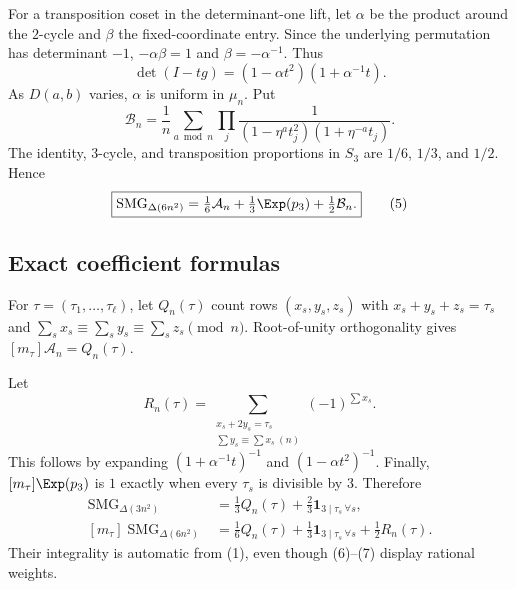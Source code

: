 \documentclass[10pt]{article}
\newcommand{\SMG}{\operatorname{SMG}}
\newcommand{\MGF}{\SMG}
\begin{document}
For a transposition coset in the determinant-one lift, let $\alpha$ be the product around the $2$-cycle and $\beta$ the fixed-coordinate entry.  Since the underlying permutation has determinant $-1$, $-\alpha\beta=1$ and $\beta=-\alpha^{-1}$.  Thus
\[
 \det(I-tg)=(1-\alpha t^2)(1+\alpha^{-1}t).
\]
As $D(a,b)$ varies, $\alpha$ is uniform in $\mu_n$.  Put
\[
 \mathcal B_n=\frac1n\sum_{a\bmod n}\prod_j
 \frac1{(1-\eta^at_j^2)(1+\eta^{-a}t_j)}. \tag{4}
\]
The identity, $3$-cycle, and transposition proportions in $S_3$ are $1/6$, $1/3$, and $1/2$.  Hence
\begin{equation}
 \boxed{\MGF_{\Delta(6n^2)}=\tfrac16\mathcal A_n+\tfrac13\Exp(p_3)+\tfrac12\mathcal B_n.} \tag{5}
\end{equation}

\subsection{Exact coefficient formulas}
For $\tau=(\tau_1,\ldots,\tau_\ell)$, let $Q_n(\tau)$ count rows
$(x_s,y_s,z_s)$ with $x_s+y_s+z_s=\tau_s$ and
$\sum_sx_s\equiv\sum_sy_s\equiv\sum_sz_s\pmod n$.  Root-of-unity orthogonality gives $[m_\tau]\mathcal A_n=Q_n(\tau)$.

Let
\[
 R_n(\tau)=\sum_{\substack{x_s+2y_s=\tau_s\\ \sum y_s\equiv\sum x_s\ (n)}}(-1)^{\sum x_s}.
\]
This follows by expanding $(1+\alpha^{-1}t)^{-1}$ and $(1-\alpha t^2)^{-1}$.  Finally, $[m_\tau]\Exp(p_3)$ is $1$ exactly when every $\tau_s$ is divisible by $3$.  Therefore
\begin{align}
 [m_\tau]\MGF_{\Delta(3n^2)}&=\tfrac13Q_n(\tau)+\tfrac23\mathbf1_{3\mid\tau_s\ \forall s}, \tag{6}\\
 [m_\tau]\MGF_{\Delta(6n^2)}&=\tfrac16Q_n(\tau)+\tfrac13\mathbf1_{3\mid\tau_s\ \forall s}+\tfrac12R_n(\tau). \tag{7}
\end{align}
Their integrality is automatic from (1), even though (6)--(7) display rational weights.
\end{document}
